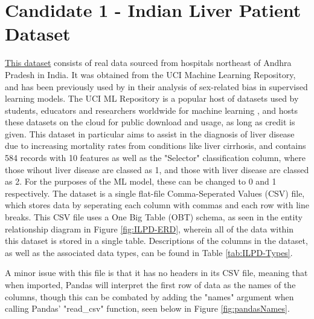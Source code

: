 \documentclass[12pt]{report}
\begin{document}
\section{Candidate 1 - Indian Liver Patient Dataset}
\href{https://archive.ics.uci.edu/dataset/225}{This dataset} \autocite{bendi_ramana_ilpd_2022} consists of real data sourced from hospitals northeast of Andhra Pradesh in India. It was obtained from the
UCI Machine Learning Repository, and has been previously used by \textcite{straw_investigating_2022} in their analysis of sex-related bias in supervised learning models. The UCI ML Repository is a popular host of datasets used by students, 
educators and researchers worldwide for machine learning \autocite{uci_machine_learning_repository_about_nodate}, and hosts these datasets 
on the cloud for public download and usage, as long as credit is given. This dataset in particular aims to assist in the diagnosis of liver
disease due to increasing mortality rates from conditions like liver cirrhosis, and contains 584 records with 10 features
as well as the "Selector" classification column, where those wihout liver disease are classed as 1, and those with liver disease 
are classed as 2. For the purposes of the ML model, these can be changed to 0 and 1 respectively. 
The dataset is a single flat-file Comma-Seperated Values (CSV) file, which stores data by seperating each column with commas
and each row with line breaks. This CSV file uses a One Big Table (OBT) schema, as seen in the entity relationship diagram 
in Figure \ref{fig:ILPD-ERD}, wherein all of the data within this dataset is stored in a single table. %
Descriptions of the columns in the dataset, as well as the associated data types, can be found in Table \ref{tab:ILPD-Types}.


A minor issue with this file is that it has no headers in its CSV file, meaning that when imported, Pandas will interpret the first 
row of data as the names of the columns, though this can be combated by adding the "names" argument when calling Pandas' "read\_csv" function,
seen below in Figure \ref{fig:pandasNames}. 
\end{document}

